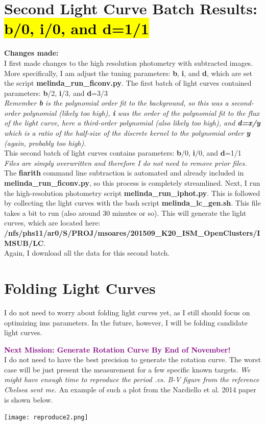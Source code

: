 \section*{Second Light Curve Batch Results: \hl{\textbf{b}/0, \textbf{i}/0, and \textbf{d}=1/1}}
\textbf{Changes made:} \\
I first made changes to the high resolution photometry with subtracted images. More specifically, I am adjust the tuning parameters: \textbf{b}, \textbf{i}, and \textbf{d}, which are set the script \textbf{melinda\_run\_ficonv.py}.
The first batch of light curves contained parameters: \textbf{b}/2, \textbf{i}/3, and \textbf{d}=3/3 \\
\textit{Remember \textbf{b} is the polynomial order fit to the background, so this was a second-order polynomial (likely too high), \textbf{i} was the order of the polynomial fit to the flux of the light curve, here a third-order polynomial (also likely too high), and \textbf{d=x/y} which is a ratio of the  half-size of the discrete kernel to the polynomial order \textbf{y} (again, probably too high).}\\
This second batch of light curves contains parameters: \textbf{b}/0, \textbf{i}/0, and \textbf{d}=1/1 \\
\textit{Files are simply overwritten and therefore I do not need to remove prior files.}\\
The \textbf{fiarith} command line subtraction is automated and already included in \textbf{melinda\_run\_ficonv.py}, so this process is completely streamlined. Next, I run the high-resolution photometry script \textbf{melinda\_run\_iphot.py}. This is followed by collecting the light curves with the bash script \textbf{melinda\_lc\_gen.sh}. This file takes a bit to run (also around 30 minutes or so). 
This will generate the light curves, which are located here: \textbf{/nfs/phs11/ar0/S/PROJ/msoares/201509\_K20\_ISM\_OpenClusters/IMSUB/LC}. \\
Again, I download all the data for this second batch.\\

\section*{Folding Light Curves}
I do not need to worry about folding light curves yet, as I still should focus on optimizing ims parameters. In the future, however, I will be folding candidate light curves.

\textcolor{purple}{\textbf{Next Mission: Generate Rotation Curve By End of November!}}\\ 
I do  not need to have the best precision to generate the rotation curve. The worst case will be just present the measurement for a few specific known targets. \textit{We might have enough time to reproduce the period .vs. B-V figure from the reference Chelsea sent me.} An example of such a plot from the Nardiello et al. 2014 paper is shown below. \\
\begin{center}
\texttt{[image: reproduce2.png]}
\end{center}